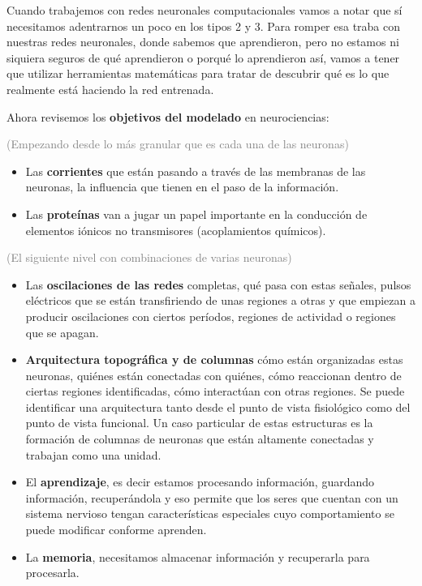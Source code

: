 Cuando trabajemos con redes neuronales computacionales vamos a notar que sí necesitamos adentrarnos un poco en los tipos 2 y 3. Para romper esa traba con nuestras redes neuronales, donde sabemos que aprendieron, pero no estamos ni siquiera seguros de qué aprendieron o porqué lo aprendieron así, vamos a tener que utilizar herramientas matemáticas para tratar de descubrir qué es lo que realmente está haciendo la red entrenada. 


Ahora revisemos los \textbf{objetivos del modelado} en neurociencias:

\textcolor{gray}{(Empezando desde lo más granular que es cada una de las neuronas)}

\begin{itemize}
 \item Las \textbf{corrientes} que están pasando a través de las membranas de las neuronas, la influencia que tienen en el paso de la información. 
 
 \item Las \textbf{proteínas} van a jugar un papel importante en la conducción de elementos iónicos no transmisores (acoplamientos químicos).
\end{itemize}

\textcolor{gray}{(El siguiente nivel con combinaciones de varias neuronas)}

\begin{itemize}
 \item Las \textbf{oscilaciones de las redes} completas, qué pasa con estas señales, pulsos eléctricos que se están transfiriendo de unas regiones a otras y que empiezan a producir oscilaciones con ciertos períodos,  regiones de actividad o regiones que se apagan.
 
 \item \textbf{Arquitectura topográfica y de columnas} cómo están organizadas estas neuronas, quiénes están conectadas con quiénes, cómo reaccionan dentro de ciertas regiones identificadas, cómo interactúan con otras regiones. Se puede identificar una arquitectura tanto desde el punto de vista fisiológico como del punto de vista funcional. Un caso particular de estas estructuras es la formación de columnas de neuronas que están altamente conectadas y trabajan como una unidad.
 
 \item El \textbf{aprendizaje}, es decir estamos procesando información, guardando información, recuperándola y eso permite que los seres que cuentan con un sistema nervioso tengan características especiales cuyo comportamiento se puede modificar conforme aprenden. 
 
 \item La \textbf{memoria}, necesitamos almacenar información y recuperarla para procesarla. 
\end{itemize}



